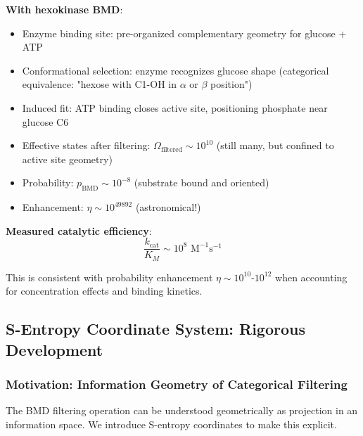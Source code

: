 \documentclass[11pt,a4paper]{article}
\begin{document}
\textbf{With hexokinase BMD}:
\begin{itemize}
\item Enzyme binding site: pre-organized complementary geometry for glucose + ATP
\item Conformational selection: enzyme recognizes glucose shape (categorical equivalence: "hexose with C1-OH in $\alpha$ or $\beta$ position")
\item Induced fit: ATP binding closes active site, positioning phosphate near glucose C6
\item Effective states after filtering: $\Omega_{\text{filtered}} \sim 10^{10}$ (still many, but confined to active site geometry)
\item Probability: $p_{\text{BMD}} \sim 10^{-8}$ (substrate bound and oriented)
\item Enhancement: $\eta \sim 10^{49892}$ (astronomical!)
\end{itemize}

\textbf{Measured catalytic efficiency}:
\begin{equation}
\frac{k_{\text{cat}}}{K_M} \sim 10^8 \text{ M}^{-1}\text{s}^{-1}
\end{equation}

This is consistent with probability enhancement $\eta \sim 10^{10}$-$10^{12}$ when accounting for concentration effects and binding kinetics.

\subsection{S-Entropy Coordinate System: Rigorous Development}

\subsubsection{Motivation: Information Geometry of Categorical Filtering}

The BMD filtering operation can be understood geometrically as projection in an information space. We introduce S-entropy coordinates to make this explicit.
\end{document}

